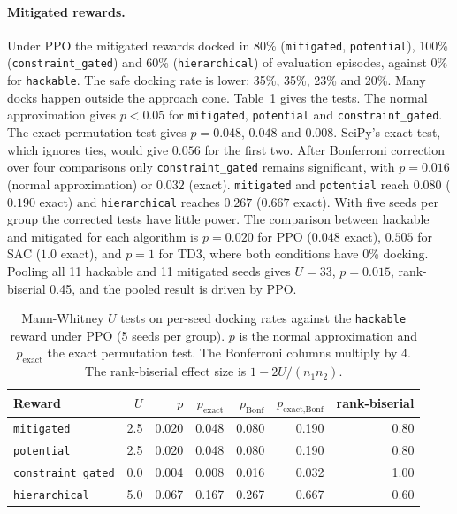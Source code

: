 \documentclass[11pt]{article}
\begin{document}
\paragraph{Mitigated rewards.} Under PPO the mitigated rewards docked in 80\%
(\texttt{mitigated}, \texttt{potential}), 100\% (\texttt{constraint\_gated}) and 60\%
(\texttt{hierarchical}) of evaluation episodes, against 0\% for \texttt{hackable}.
The safe docking rate is lower: 35\%, 35\%, 23\% and 20\%. Many docks happen
outside the approach cone. Table~\ref{tab:tests} gives the tests.
The normal approximation gives $p<0.05$ for \texttt{mitigated},
\texttt{potential} and \texttt{constraint\_gated}. The exact permutation test
gives $p=0.048$, $0.048$ and $0.008$. SciPy's exact test, which ignores ties,
would give $0.056$ for the first two. After Bonferroni correction over four
comparisons only \texttt{constraint\_gated} remains significant, with
$p=0.016$ (normal approximation) or $0.032$ (exact). \texttt{mitigated} and
\texttt{potential} reach $0.080$ ($0.190$ exact) and \texttt{hierarchical}
reaches $0.267$ ($0.667$ exact). With five seeds per group the corrected tests
have little power. The comparison between hackable and mitigated for each
algorithm is $p=0.020$ for PPO ($0.048$ exact), $0.505$ for SAC ($1.0$ exact),
and $p=1$ for TD3, where both conditions have 0\% docking. Pooling all 11
hackable and 11 mitigated seeds gives $U=33$, $p=0.015$, rank-biserial 0.45,
and the pooled result is driven by PPO.

\begin{table}[t]
\centering
\small
\caption{Mann-Whitney $U$ tests on per-seed docking rates against the
\texttt{hackable} reward under PPO (5 seeds per group). $p$ is the normal
approximation and $p_{\text{exact}}$ the exact permutation test. The Bonferroni
columns multiply by 4. The rank-biserial effect size is $1-2U/(n_1n_2)$.}
\label{tab:tests}
\begin{tabular}{lrrrrrr}
\toprule
Reward & $U$ & $p$ & $p_{\text{exact}}$ & $p_{\text{Bonf}}$ & $p_{\text{exact,Bonf}}$ & rank-biserial \\
\midrule
\texttt{mitigated} & 2.5 & 0.020 & 0.048 & 0.080 & 0.190 & 0.80 \\
\texttt{potential} & 2.5 & 0.020 & 0.048 & 0.080 & 0.190 & 0.80 \\
\texttt{constraint\_gated} & 0.0 & 0.004 & 0.008 & 0.016 & 0.032 & 1.00 \\
\texttt{hierarchical} & 5.0 & 0.067 & 0.167 & 0.267 & 0.667 & 0.60 \\
\bottomrule
\end{tabular}
\end{table}
\end{document}
